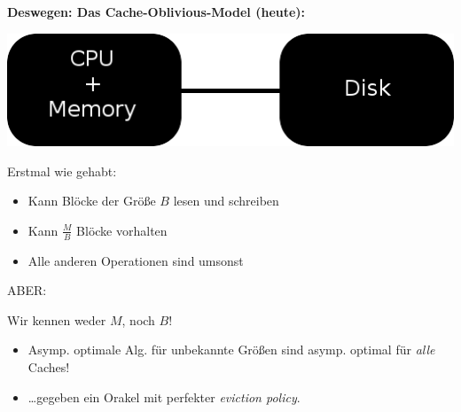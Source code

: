 \documentclass{beamer}
\begin{document}
\begin{frame}
\textbf{Deswegen: Das Cache-Oblivious-Model (heute):}

\begin{center}
\includegraphics[scale=0.325]{model1.png} 
\end{center}
\pause

\begin{multicols}{2}
Erstmal wie gehabt:\smallskip\smallskip

\begin{itemize}
\item Kann Blöcke der Größe $B$ lesen und schreiben
\item Kann $\frac{M}{B}$ Blöcke vorhalten
\item Alle anderen Operationen sind \glqq umsonst\grqq
\end{itemize}

\columnbreak
\pause

ABER:

Wir kennen weder $M$, noch $B$! \smallskip\smallskip
\pause

\begin{itemize}
\item Asymp. optimale Alg. für unbekannte Größen sind asymp. optimal für \emph{alle} Caches!\pause
\item \dots gegeben ein Orakel mit perfekter \emph{eviction policy}.
\end{itemize}

\end{multicols}
\end{frame}

\end{document}

